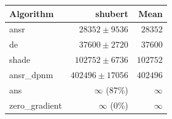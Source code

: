\begin{tabular}{lrr}
\toprule
Algorithm & shubert & Mean \\
\midrule
ansr & $28352 \pm 9536$ & $28352$ \\
de & $37600 \pm 2720$ & $37600$ \\
shade & $102752 \pm 6736$ & $102752$ \\
ansr\_dpnm & $402496 \pm 17056$ & $402496$ \\
ans & $\infty$ (87\%) & $\infty$ \\
zero\_gradient & $\infty$ (0\%) & $\infty$ \\
\bottomrule
\end{tabular}
